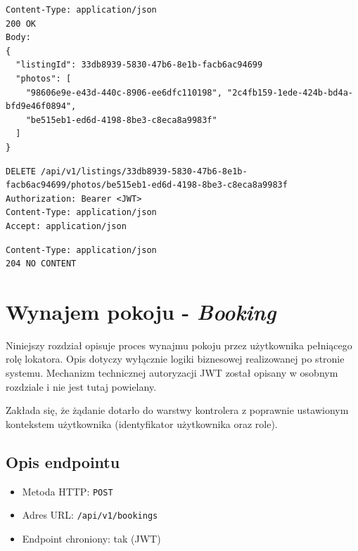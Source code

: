\documentclass[11pt, a4paper]{article}
\begin{document}
\begin{lstlisting}[style=http,caption={Odpowiedź HTTP — sukces}]
Content-Type: application/json
200 OK
Body:
{
  "listingId": 33db8939-5830-47b6-8e1b-facb6ac94699
  "photos": [
    "98606e9e-e43d-440c-8906-ee6dfc110198", "2c4fb159-1ede-424b-bd4a-bfd9e46f0894",
    "be515eb1-ed6d-4198-8be3-c8eca8a9983f"
  ]
}
\end{lstlisting}

\begin{lstlisting}[style=http,caption={Żądanie HTTP - Usunięcie danego zdjęcia}]
DELETE /api/v1/listings/33db8939-5830-47b6-8e1b-facb6ac94699/photos/be515eb1-ed6d-4198-8be3-c8eca8a9983f
Authorization: Bearer <JWT>
Content-Type: application/json
Accept: application/json
\end{lstlisting}

\begin{lstlisting}[style=http,caption={Odpowiedź HTTP — sukces}]
Content-Type: application/json
204 NO CONTENT
\end{lstlisting}

\section{Wynajem pokoju - \textit{Booking}}

Niniejszy rozdział opisuje proces wynajmu pokoju przez użytkownika pełniącego
rolę lokatora. Opis dotyczy wyłącznie logiki biznesowej realizowanej po stronie
systemu. Mechanizm technicznej autoryzacji JWT został opisany w osobnym rozdziale
i nie jest tutaj powielany.

Zakłada się, że żądanie dotarło do warstwy kontrolera z poprawnie ustawionym
kontekstem użytkownika (identyfikator użytkownika oraz role).

\subsection{Opis endpointu}

\begin{itemize}
    \item Metoda HTTP: \texttt{POST}
    \item Adres URL: \texttt{/api/v1/bookings}
    \item Endpoint chroniony: tak (JWT)
\end{itemize}
\end{document}
